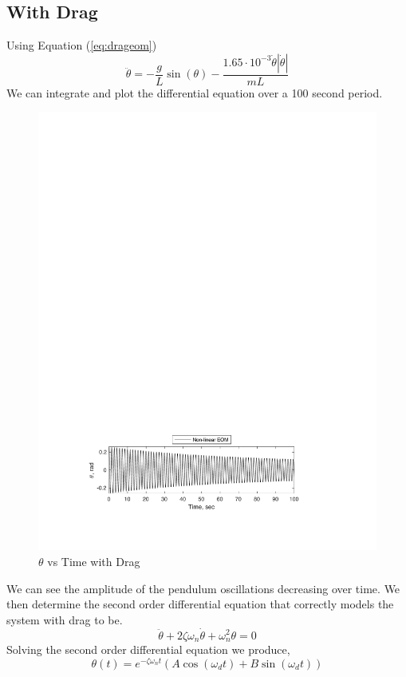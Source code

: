 \documentclass[12pt]{report}
\begin{document}
\begin{flushleft}
\subsection{With Drag}
Using Equation (\ref{eq:drageom})
$$
\ddot{\theta} = -\frac{g}{L}\sin(\theta) - \frac{1.65 \cdot 10^{-3}\dot{\theta}|\dot{\theta}|}{mL}
$$
We can integrate and plot the differential equation over a 100 second period. \\
\begin{figure}[ht]
  \includegraphics[center]{thetadrag}
  \caption{$\theta$ vs Time with Drag}
  \label{fig:thetadrag}
\end{figure}
We can see the amplitude of the pendulum oscillations decreasing over time.
We then determine the second order differential equation that correctly models
the system with drag to be.
$$\ddot{\theta}+2\zeta\omega_n\dot{\theta}+\omega_n^2\theta=0$$
Solving the second order differential equation we produce,
\begin{equation} \label{eq:thetat}
\theta(t)=e^{-\zeta\omega_nt}(A\cos(\omega_dt)+B\sin(\omega_dt))

\end{equation}
\end{flushleft}
\end{document}
